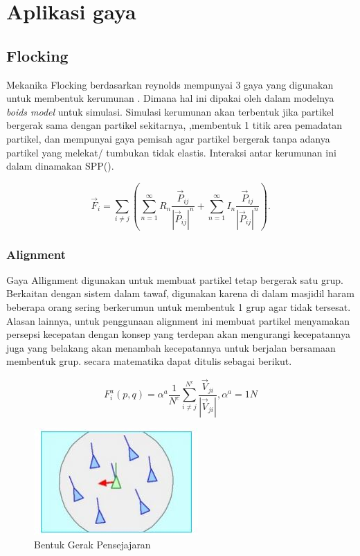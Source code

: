 \section{Aplikasi gaya}\label{cha:aplikasi gaya}
\subsection{Flocking}\label{sec:flocking}

Mekanika Flocking berdasarkan reynolds mempunyai 3 gaya yang digunakan untuk membentuk kerumunan   \citep{Reynolds1987} \citep{Nasir2016}. Dimana hal ini dipakai oleh \citep{Chate2008} dalam modelnya \emph{boids model} untuk simulasi. Simulasi kerumunan akan terbentuk jika partikel bergerak sama dengan partikel sekitarnya, ,membentuk 1 titik area pemadatan partikel, dan mempunyai gaya pemisah agar partikel bergerak tanpa adanya partikel yang melekat/ tumbukan tidak elastis. Interaksi antar kerumunan ini dalam \citep{Chate2008} dinamakan SPP(). 

\begin{equation}
\vec{F}_i = \sum_{i \neq j} (\sum_{n=1}^{\infty} R_{n} \dfrac{\vec{P}_{ij}}{|\vec{P}_{ij}|^n}  + \sum_{n=1}^{\infty} I_{n} \dfrac{\vec{P}_{ij}}{|\vec{P}_{ij}|^n}). 
\end{equation}

\subsubsection{Alignment}\label{sec:alignment}
\hspace {0.5cm} Gaya Allignment digunakan untuk membuat partikel tetap bergerak satu grup. Berkaitan dengan sistem dalam tawaf, digunakan karena di dalam masjidil haram beberapa orang sering berkerumun untuk membentuk 1 grup agar tidak tersesat. Alasan lainnya, untuk penggunaan alignment ini membuat partikel menyamakan persepsi kecepatan dengan konsep yang terdepan akan mengurangi kecepatannya juga yang belakang akan menambah kecepatannya untuk berjalan bersamaan membentuk grup. secara matematika dapat ditulis sebagai berikut.

\begin{equation}
 F_i^a(p,q) = \alpha^a \dfrac{1}{N^c}\sum^{N^c}_{i \neq j}\dfrac{\vec{V}_{ji}}{|\vec{V}_{ji}|},\alpha^a = 1N
\end{equation}


\begin{figure}
\centering
\includegraphics[scale=0.5]{gambar/allignment}
\caption{Bentuk Gerak Pensejajaran}
\end{figure}

